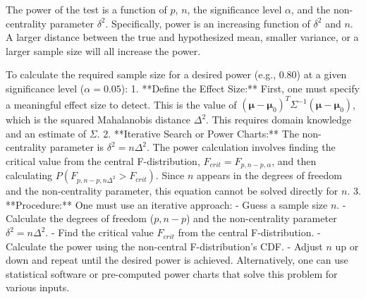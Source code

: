 The power of the test is a function of $p$, $n$, the significance level $\alpha$, and the non-centrality parameter $\delta^2$. Specifically, power is an increasing function of $\delta^2$ and $n$. A larger distance between the true and hypothesized mean, smaller variance, or a larger sample size will all increase the power.

To calculate the required sample size for a desired power (e.g., 0.80) at a given significance level ($\alpha=0.05$):
1.  **Define the Effect Size:** First, one must specify a meaningful effect size to detect. This is the value of $(\boldsymbol{\mu} - \boldsymbol{\mu}_0)^T \Sigma^{-1} (\boldsymbol{\mu} - \boldsymbol{\mu}_0)$, which is the squared Mahalanobis distance $\Delta^2$. This requires domain knowledge and an estimate of $\Sigma$.
2.  **Iterative Search or Power Charts:** The non-centrality parameter is $\delta^2 = n\Delta^2$. The power calculation involves finding the critical value from the central F-distribution, $F_{crit} = F_{p, n-p, \alpha}$, and then calculating $P(F_{p, n-p, n\Delta^2} > F_{crit})$. Since $n$ appears in the degrees of freedom and the non-centrality parameter, this equation cannot be solved directly for $n$.
3.  **Procedure:** One must use an iterative approach:
    - Guess a sample size $n$.
    - Calculate the degrees of freedom ($p, n-p$) and the non-centrality parameter $\delta^2 = n\Delta^2$.
    - Find the critical value $F_{crit}$ from the central F-distribution.
    - Calculate the power using the non-central F-distribution's CDF.
    - Adjust $n$ up or down and repeat until the desired power is achieved.
    Alternatively, one can use statistical software or pre-computed power charts that solve this problem for various inputs.
